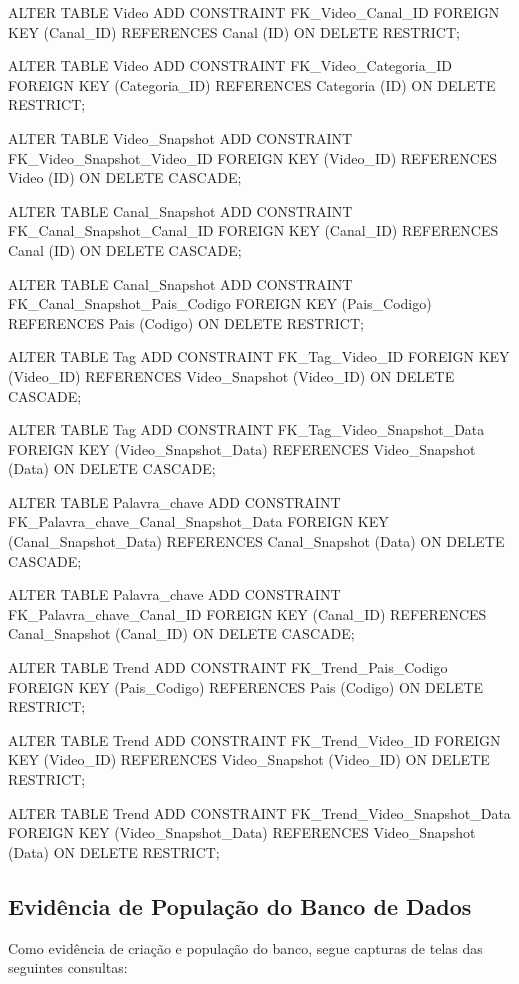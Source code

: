 \begin{code}
ALTER TABLE Video ADD CONSTRAINT FK_Video_Canal_ID
  FOREIGN KEY (Canal_ID)
  REFERENCES Canal (ID)
  ON DELETE RESTRICT;

ALTER TABLE Video ADD CONSTRAINT FK_Video_Categoria_ID
  FOREIGN KEY (Categoria_ID)
  REFERENCES Categoria (ID)
  ON DELETE RESTRICT;

ALTER TABLE Video_Snapshot ADD CONSTRAINT FK_Video_Snapshot_Video_ID
  FOREIGN KEY (Video_ID)
  REFERENCES Video (ID)
  ON DELETE CASCADE;

ALTER TABLE Canal_Snapshot ADD CONSTRAINT FK_Canal_Snapshot_Canal_ID
  FOREIGN KEY (Canal_ID)
  REFERENCES Canal (ID)
  ON DELETE CASCADE;

ALTER TABLE Canal_Snapshot ADD CONSTRAINT
  FK_Canal_Snapshot_Pais_Codigo
  FOREIGN KEY (Pais_Codigo)
  REFERENCES Pais (Codigo)
  ON DELETE RESTRICT;

ALTER TABLE Tag ADD CONSTRAINT FK_Tag_Video_ID
  FOREIGN KEY (Video_ID)
  REFERENCES Video_Snapshot (Video_ID)
  ON DELETE CASCADE;

ALTER TABLE Tag ADD CONSTRAINT FK_Tag_Video_Snapshot_Data
  FOREIGN KEY (Video_Snapshot_Data)
  REFERENCES Video_Snapshot (Data)
  ON DELETE CASCADE;

ALTER TABLE Palavra_chave ADD CONSTRAINT
  FK_Palavra_chave_Canal_Snapshot_Data
  FOREIGN KEY (Canal_Snapshot_Data)
  REFERENCES Canal_Snapshot (Data)
  ON DELETE CASCADE;

ALTER TABLE Palavra_chave ADD CONSTRAINT FK_Palavra_chave_Canal_ID
  FOREIGN KEY (Canal_ID)
  REFERENCES Canal_Snapshot (Canal_ID)
  ON DELETE CASCADE;

ALTER TABLE Trend ADD CONSTRAINT FK_Trend_Pais_Codigo
  FOREIGN KEY (Pais_Codigo)
  REFERENCES Pais (Codigo)
  ON DELETE RESTRICT;

ALTER TABLE Trend ADD CONSTRAINT FK_Trend_Video_ID
  FOREIGN KEY (Video_ID)
  REFERENCES Video_Snapshot (Video_ID)
  ON DELETE RESTRICT;

ALTER TABLE Trend ADD CONSTRAINT FK_Trend_Video_Snapshot_Data
  FOREIGN KEY (Video_Snapshot_Data)
  REFERENCES Video_Snapshot (Data)
  ON DELETE RESTRICT;
\end{code}

\subsection{Evidência de População do Banco de Dados}

Como evidência de criação e população do banco, segue capturas de telas das seguintes consultas:

